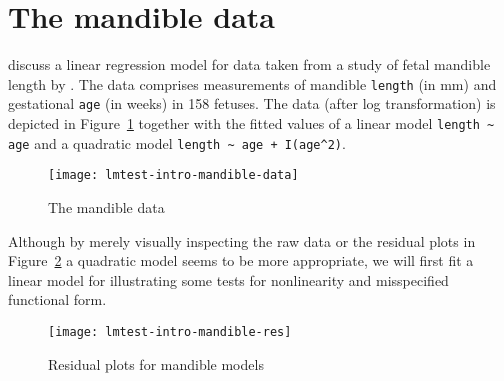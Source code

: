 \documentclass[a4paper]{article}
\begin{document}
\section{The mandible data} \label{sec:mandible}

\cite{lmtest:Royston+Altman:1994}
discuss a linear regression model for data taken from
a study of fetal mandible length by \cite{lmtest:Chitty+Campbell+Altman:1993}.
The data comprises measurements of mandible \texttt{length} (in mm)
and gestational \texttt{age} (in weeks) in 158 fetuses.
The data (after log transformation) is depicted in Figure~\ref{mandible-data}
together with the fitted values of a linear model \verb/length ~ age/
and a quadratic model \verb/length ~ age + I(age^2)/.


\begin{figure}[htbp]
\begin{center}
\texttt{[image: lmtest-intro-mandible-data]}
\caption{\label{mandible-data} The mandible data}
\end{center}
\end{figure}

Although by merely visually inspecting the raw data
or the residual plots in Figure~\ref{mandible-res} a quadratic model
seems to be more appropriate, we will first fit a linear model for illustrating
some tests for nonlinearity and misspecified functional form.

\begin{figure}[htbp]
\begin{center}
\texttt{[image: lmtest-intro-mandible-res]}
\caption{\label{mandible-res} Residual plots for mandible models}
\end{center}
\end{figure}
\end{document}

